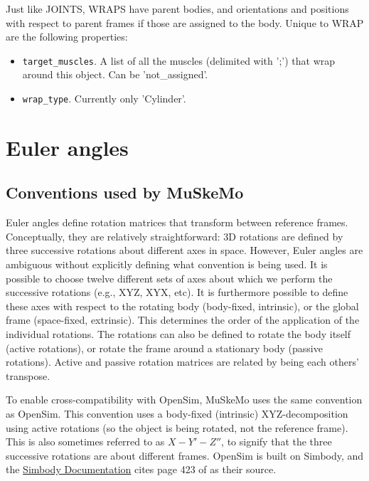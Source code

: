 \documentclass{article}
\begin{document}
Just like JOINTS, WRAPS have parent bodies, and orientations and positions with respect to parent frames if those are assigned to the body. Unique to WRAP are the following properties:

\begin{itemize}
    \item \texttt{target\_muscles}. A list of all the muscles (delimited with ';') that wrap around this object. Can be 'not\_assigned'.
    \item \texttt{wrap\_type}. Currently only 'Cylinder'.
\end{itemize}
 
\appendix
\section{Euler angles}
\label{sec:eulerangles}

\subsection{Conventions used by MuSkeMo}
Euler angles define rotation matrices that transform between reference frames. Conceptually, they are relatively straightforward: 3D rotations are defined by three successive rotations about different axes in space. However, Euler angles are ambiguous without explicitly defining what convention is being used. It is possible to choose twelve different sets of axes about which we perform the successive rotations (e.g., XYZ, XYX, etc). It is furthermore possible to define these axes with respect to the rotating body (body-fixed, intrinsic), or the global frame (space-fixed, extrinsic). This determines the order of the application of the individual rotations. The rotations can also be defined to rotate the body itself (active rotations), or rotate the frame around a stationary body (passive rotations). Active and passive rotation matrices are related by being each others' transpose.

To enable cross-compatibility with OpenSim, MuSkeMo uses the same convention as OpenSim. This convention uses a body-fixed (intrinsic) XYZ-decomposition using active rotations (so the object is being rotated, not the reference frame). This is also sometimes referred to as \(X-Y'-Z''\), to signify that the three successive rotations are about different frames. OpenSim is built on Simbody, and the \href{https://simtk.org/api_docs/molmodel/api_docs22/Simbody/html/classSimTK_1_1Rotation__.html}{Simbody Documentation} cites page 423 of \cite{kaneSpacecraftDynamics1983} as their source.
\end{document}
